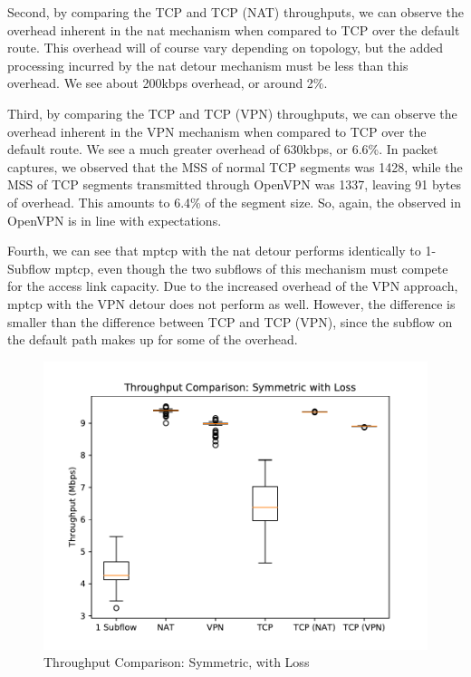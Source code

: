 \documentclass{cwru}
\begin{document}
Second, by comparing the TCP and TCP (NAT) throughputs, we can observe the
overhead inherent in the \ac{nat} mechanism when compared to TCP over the
default route. This overhead will of course vary depending on topology, but the
added processing incurred by the \ac{nat} detour mechanism must be less than
this overhead. We see about 200kbps overhead, or around 2\%.

Third, by comparing the TCP and TCP (VPN) throughputs, we can observe the
overhead inherent in the VPN mechanism when compared to TCP over the default
route. We see a much greater overhead of 630kbps, or 6.6\%. In packet captures,
we observed that the MSS of normal TCP segments was 1428, while the MSS of TCP
segments transmitted through OpenVPN was 1337, leaving 91 bytes of overhead.
This amounts to 6.4\% of the segment size. So, again, the observed in OpenVPN is
in line with expectations.

Fourth, we can see that \ac{mptcp} with the \ac{nat} detour performs identically
to 1-Subflow \ac{mptcp}, even though the two subflows of this mechanism must
compete for the access link capacity. Due to the increased overhead of the VPN
approach, \ac{mptcp} with the VPN detour does not perform as well. However, the
difference is smaller than the difference between TCP and TCP (VPN), since the
subflow on the default path makes up for some of the overhead.

\begin{figure}
  \centering
  \includegraphics[height=0.42\textheight]{figures/sym-lossy.pdf}
  \caption{Throughput Comparison: Symmetric, with Loss}
  \label{fig:sym_lossy}
\end{figure}
\end{document}

